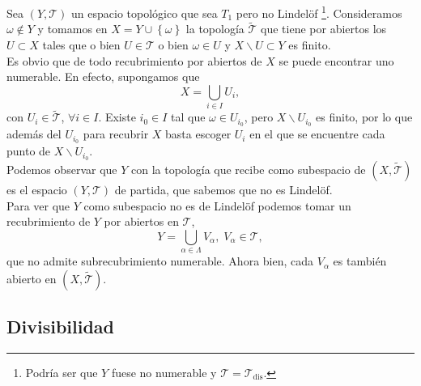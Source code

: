 \begin{eg}
	Sea $\displaystyle \left(Y, \mathcal{T}\right) $ un espacio topológico que sea $\displaystyle T_{1} $ pero no Lindelöf \footnote{Podría ser que $\displaystyle Y $ fuese no numerable y $\displaystyle \mathcal{T} =\mathcal{T}_{\text{dis}} $.}. Consideramos $\displaystyle \omega \not\in Y $ y tomamos en $\displaystyle X = Y \cup \left\{ \omega \right\}  $ la topología $\displaystyle \widetilde{\mathcal{T}} $ que tiene por abiertos los $\displaystyle U \subset X $ tales que o bien $\displaystyle U \in \mathcal{T} $ o bien $\displaystyle \omega \in U $ y $\displaystyle X \backslash U \subset Y $ es finito. \\
\indent Es obvio que de todo recubrimiento por abiertos de $\displaystyle X $ se puede encontrar uno numerable. En efecto, supongamos que 
\[ X = \bigcup_{i \in I}U_{i} ,\]
con $\displaystyle U_{i}\in \widetilde{\mathcal{T}} $, $\displaystyle \forall i \in I $. Existe $\displaystyle i_{0} \in I $ tal que $\displaystyle \omega \in U_{i_{0}} $, pero $\displaystyle X \backslash U_{i_{0}} $ es finito, por lo que además del $\displaystyle U_{i_{0}} $ para recubrir $\displaystyle X $ basta escoger $\displaystyle U_{i} $ en el que se encuentre cada punto de $\displaystyle X\backslash U_{i_{0}} $. \\
\indent Podemos observar que $\displaystyle Y $ con la topología que recibe como subespacio de $\displaystyle \left(X, \widetilde{\mathcal{T}}\right) $ es el espacio $\displaystyle \left(Y, \mathcal{T}\right) $ de partida, que sabemos que no es Lindelöf. \\
\indent Para ver que $\displaystyle Y $ como subespacio no es de Lindelöf podemos tomar un recubrimiento de $\displaystyle Y $ por abiertos en $\displaystyle \mathcal{T} $,
\[Y = \bigcup_{\alpha \in \Lambda }V_{\alpha }, \; V_{\alpha }\in \mathcal{T} ,\]
que no admite subrecubrimiento numerable. Ahora bien, cada $\displaystyle V_{\alpha } $ es también abierto en $\displaystyle \left(X, \widetilde{\mathcal{T}}\right) $. 
\end{eg}
\subsection*{Divisibilidad}

